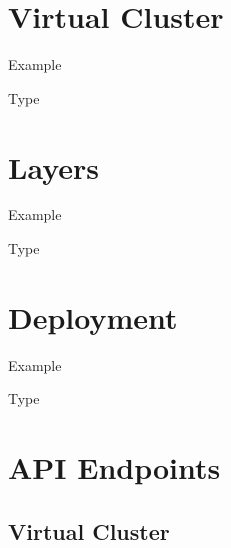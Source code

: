 \documentclass[11pt]{article}
\begin{document}
\section{Virtual Cluster}

Example

\begin{quote}

\end{quote}

Type

\begin{quote}

\end{quote}

\section{Layers}

Example

\begin{quote}

\end{quote}

Type

\begin{quote}

\end{quote}

\section{Deployment}

Example

\begin{quote}

\end{quote}

Type

\begin{quote}

\end{quote}

\section{API Endpoints}

\subsection{Virtual Cluster}
\end{document}
